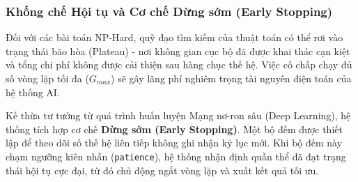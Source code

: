 \documentclass[12pt,a4paper]{article}
\numberwithin{figure}{subsection}
\numberwithin{table}{subsection}
\begin{document}
\subsubsection{Khống chế Hội tụ và Cơ chế Dừng sớm (Early Stopping)}

Đối với các bài toán NP-Hard, quỹ đạo tìm kiếm của thuật toán có thể rơi vào trạng thái bão hòa (Plateau) - nơi không gian cục bộ đã được khai thác cạn kiệt và tổng chi phí không được cải thiện sau hàng chục thế hệ. Việc cố chấp chạy đủ số vòng lặp tối đa ($G_{max}$) sẽ gây lãng phí nghiêm trọng tài nguyên điện toán của hệ thống AI.

Kế thừa tư tưởng từ quá trình huấn luyện Mạng nơ-ron sâu (Deep Learning), hệ thống tích hợp cơ chế \textbf{Dừng sớm (Early Stopping)}. Một bộ đếm được thiết lập để theo dõi số thế hệ liên tiếp không ghi nhận kỷ lục mới. Khi bộ đếm này chạm ngưỡng kiên nhẫn (\texttt{patience}), hệ thống nhận định quần thể đã đạt trạng thái hội tụ cực đại, từ đó chủ động ngắt vòng lặp và xuất kết quả tối ưu.
\end{document}
